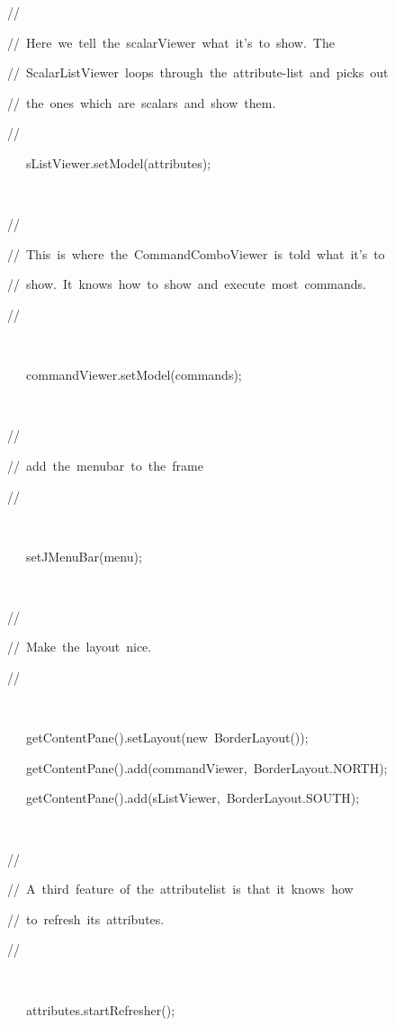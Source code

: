 \begin{lyxcode}
//

//~Here~we~tell~the~scalarViewer~what~it's~to~show.~The

//~ScalarListViewer~loops~through~the~attribute-list~and~picks~out

//~the~ones~which~are~scalars~and~show~them.

//



~~~sListViewer.setModel(attributes);

~



//

//~This~is~where~the~CommandComboViewer~is~told~what~it's~to

//~show.~It~knows~how~to~show~and~execute~most~commands.

//

~



~~~commandViewer.setModel(commands);

~



//

//~add~the~menubar~to~the~frame

//

~



~~~setJMenuBar(menu);

~



//

//~Make~the~layout~nice.

//

~



~~~getContentPane().setLayout(new~BorderLayout());

~~~getContentPane().add(commandViewer,~BorderLayout.NORTH);

~~~getContentPane().add(sListViewer,~BorderLayout.SOUTH);

~



//

//~A~third~feature~of~the~attributelist~is~that~it~knows~how

//~to~refresh~its~attributes.

//

~



~~~attributes.startRefresher();

~




\end{lyxcode}
